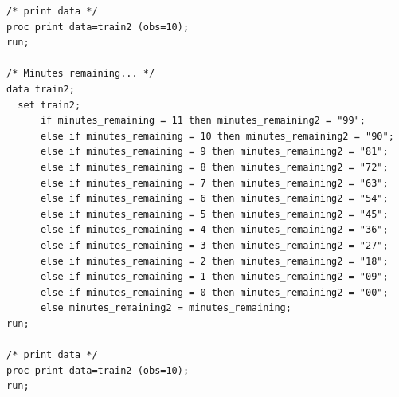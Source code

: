 \begin{verbatim}
/* print data */
proc print data=train2 (obs=10);
run;

/* Minutes remaining... */
data train2;
  set train2;
      if minutes_remaining = 11 then minutes_remaining2 = "99";
      else if minutes_remaining = 10 then minutes_remaining2 = "90";
	  else if minutes_remaining = 9 then minutes_remaining2 = "81";
	  else if minutes_remaining = 8 then minutes_remaining2 = "72";
	  else if minutes_remaining = 7 then minutes_remaining2 = "63";
	  else if minutes_remaining = 6 then minutes_remaining2 = "54";
	  else if minutes_remaining = 5 then minutes_remaining2 = "45";
	  else if minutes_remaining = 4 then minutes_remaining2 = "36";
	  else if minutes_remaining = 3 then minutes_remaining2 = "27";
	  else if minutes_remaining = 2 then minutes_remaining2 = "18";
	  else if minutes_remaining = 1 then minutes_remaining2 = "09";
	  else if minutes_remaining = 0 then minutes_remaining2 = "00";
	  else minutes_remaining2 = minutes_remaining;
run;

/* print data */
proc print data=train2 (obs=10);
run;


\end{verbatim}
